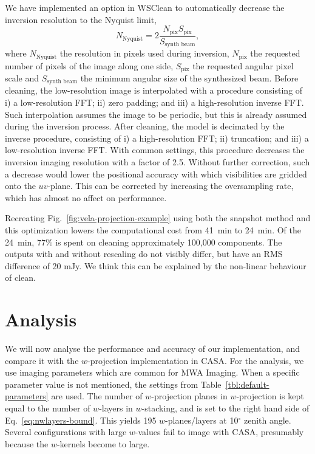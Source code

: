 \documentclass[useAMS,usenatbib]{mn2e}
\newcommand{\degree}{\ensuremath{^{\circ}}\xspace}
\begin{document}
We have implemented an option in WSClean to automatically decrease the inversion resolution to the Nyquist limit,
\begin{equation}\label{eq:nyquist-resolution}
 N_\textrm{Nyquist} = 2 \frac{N_\textrm{pix} S_\textrm{pix}}{S_\textrm{synth beam}},
\end{equation}
where $N_\textrm{Nyquist}$ the resolution in pixels used during inversion, $N_\textrm{pix}$ the requested number of pixels of the image along one side, $S_\textrm{pix}$ the requested angular pixel scale and $S_\textrm{synth beam}$ the minimum angular size of the synthesized beam. Before cleaning, the low-resolution image is interpolated with a procedure consisting of i) a low-resolution FFT; ii) zero padding; and iii) a high-resolution inverse FFT. Such interpolation assumes the image to be periodic, but this is already assumed during the inversion process. After cleaning, the model is decimated by the inverse procedure, consisting of i) a high-resolution FFT; ii) truncation; and iii) a low-resolution inverse FFT. With common settings, this procedure decreases the inversion imaging resolution with a factor of 2.5. Without further correction, such a decrease would lower the positional accuracy with which visibilities are gridded onto the $uv$-plane. This can be corrected by increasing the oversampling rate, which has almost no affect on performance.

Recreating Fig.~\ref{fig:vela-projection-example} using both the snapshot method and this optimization lowers the computational cost from 41~min to 24~min. Of the 24~min, 77\% is spent on cleaning approximately 100,000 components. The outputs with and without rescaling do not visibly differ, but have an RMS difference of 20 mJy. We think this can be explained by the non-linear behaviour of clean.

\section{Analysis} \label{sec:analysis}
We will now analyse the performance and accuracy of our implementation, and compare it with the $w$-projection implementation in CASA. For the analysis, we use imaging parameters which are common for MWA Imaging. When a specific parameter value is not mentioned, the settings from Table~\ref{tbl:default-parameters} are used. The number of $w$-projection planes in $w$-projection is kept equal to the number of $w$-layers in $w$-stacking, and is set to the right hand side of Eq.~\eqref{eq:nwlayers-bound}. This yields 195 $w$-planes/layers at 10\degree zenith angle. Several configurations with large $w$-values fail to image with CASA, presumably because the $w$-kernels become to large.
\end{document}

